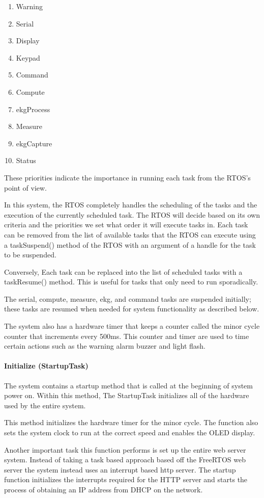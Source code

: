 \documentclass[12pt]{article} %
\begin{document}
		\begin{enumerate}
			\item Warning
			\item Serial
			\item Display
			\item Keypad
			\item Command
			\item Compute
			\item ekgProcess
			\item Measure
			\item ekgCapture
			\item Status
		\end{enumerate}
		These priorities indicate the importance in running each task from the RTOS's point of view.

		In this system, the RTOS completely handles the scheduling of the tasks and the
execution of the currently scheduled task. The RTOS will decide based on its
own criteria and the priorities we set what order it will execute tasks in.
Each task can be removed from the list of available tasks that the RTOS can
execute using a taskSuspend() method of the RTOS with an argument of a handle
for the task to be suspended.

Conversely, Each task can be replaced into the list of scheduled tasks with a
taskResume() method. This is useful for tasks that only need to run sporadically. 

The serial, compute, measure, ekg, and command tasks are suspended initially;
these tasks are resumed when needed for system functionality as described
below. 

The system also has a hardware timer that keeps a counter called the minor
cycle counter that increments every 500ms. This counter and timer are used to
time certain actions such as the warning alarm buzzer and light flash.

\paragraph{Initialize (StartupTask)} The system contains a startup method that
is called at the beginning of system power on. Within this method, The
StartupTask initializes all of the hardware used by the entire system.

This method initializes the hardware timer for the minor cycle. The function
also sets the system clock to run at the correct speed and enables the OLED
display.

Another important task this function performs is set up the entire web
server system. Instead of taking a task based approach based off the FreeRTOS
web server the system instead
uses an interrupt based http server. The startup function initializes the
interrupts required for the HTTP server and starts the process of obtaining an
IP address from DHCP on the network. 
\end{document}
